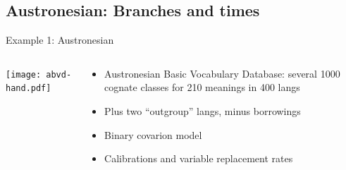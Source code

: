 \documentclass[9pt]{beamer}
\begin{document}
\subsection{Austronesian: Branches and times}
\begin{frame}{Example 1: Austronesian}
  \begin{columns}
    \begin{column}{0.5\textwidth}
      \texttt{[image: abvd-hand.pdf]}
    \end{column}
    \begin{column}{0.5\textwidth}
      \begin{itemize}
      \item Austronesian Basic Vocabulary Database: several 1000 cognate classes for 210 meanings in 400 langs
      \item Plus two “outgroup” langs, minus borrowings
      \item Binary covarion model
      \item Calibrations and variable replacement rates
      \end{itemize}
    \end{column}
  \end{columns}
\end{frame}
\end{document}
